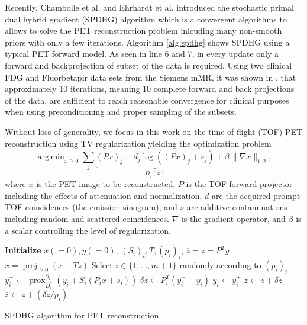 \documentclass[11pt,twocolumn,twoside]{article}
\DeclareMathOperator{\proj}{proj}
\DeclareMathOperator{\prox}{prox}
\DeclareMathOperator*{\argmin}{arg\,min}
\begin{document}
Recently, Chambolle et al. \cite{Chambolle2018} and  Ehrhardt et al. \cite{Ehrhardt2019} introduced 
the stochastic primal dual hybrid gradient (SPDHG) algorithm which is a convergent algorithms
to allows to solve the PET reconstruction problem inlcuding many non-smooth priors with
only a few iterations. 
Algorithm \ref{alg:spdhg} shows SPDHG using a typical PET forward model.
As seen in line 6 and 7, in every update only a forward and backprojection of subset
of the data is required.
Using two clinical FDG and Fluorbetapir data sets from the Siemens mMR, 
it was shown in \cite{Ehrhardt2019}, that approximately 10 iterations, meaning 10 complete 
forward and back projections of the data, are sufficient to reach reasonable convergence
for clinical purposes when using preconditioning and proper sampling of the subsets.

Without loss of generality, we focus in this work on the time-of-flight (TOF) PET reconstruction 
using TV regularization yielding the optimization problem
%
\begin{equation}
\argmin _{x\geq 0} \sum_j \underbrace{(Px)_j -  d_j \log \left( (Px)_ j + s_j \right)}_{D_j(x)} + \beta \, \|\nabla x\|_{1,2},
\end{equation}
%
where $x$ is the PET image to be reconstructed, $P$ is the TOF forward projector including the effects
of attenuation and normalization, $d$ are the acquired prompt TOF coincidences (the emission sinogram),
and $s$ are additive contaminations including random and scattered coincidences. $\nabla$ is the gradient
operator, and $\beta$ is a scalar controlling the level of regularization.

\begin{algorithm}[t]
\begin{algorithmic}[1]
\State \textbf{Initialize} $x(=0),y(=0)$, $(S_i)_i,T,(p_i)_i$,
\State $\overline{z} = z = P^T y$
\Repeat
	\State $x = \proj_{\geq 0} (x - T \overline{z})$
	\State Select $i \in \{ 1,\ldots,m+1\} $ randomly according to $(p_i)_i$
	\State \quad $y_i^+ \gets \prox_{D_i^*}^{S_i} ( y_i + S_i  ( P_i x + s_i))$
	\State \quad $\delta z \gets P_i^T (y_i^+ - y_i)$
	\State \quad $y_i \gets y_i^+$
	\State $z \gets z + \delta z$
	\State $\overline{z} \gets  z + (\delta z/p_i)$
\State {}
\end{algorithmic}
\caption{SPDHG algorithm for PET reconstruction \cite{Ehrhardt2019}}
\label{alg:spdhg}
\end{algorithm}
\end{document}
